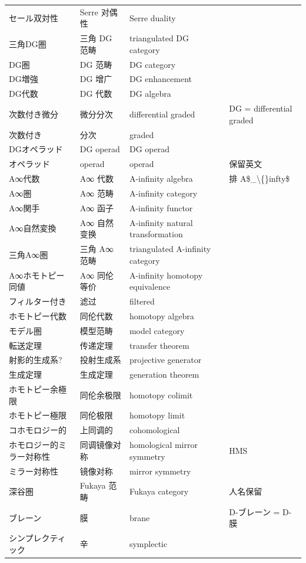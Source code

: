 \begin{longtable}{p{}p{}p{}p{}}
セール双対性 & Serre 对偶性 & Serre duality &  \\
三角DG圏 & 三角 DG 范畴 & triangulated DG category &  \\
DG圏 & DG 范畴 & DG category &  \\
DG増強 & DG 增广 & DG enhancement &  \\
DG代数 & DG 代数 & DG algebra &  \\
次数付き微分 & 微分分次 & differential graded & DG = differential graded \\
次数付き & 分次 & graded &  \\
DGオペラッド & DG operad & DG operad &  \\
オペラッド & operad & operad & 保留英文 \\
A∞代数 & A∞ 代数 & A-infinity algebra & 排 A\$\_\textbackslash\{\}infty\$ \\
A∞圏 & A∞ 范畴 & A-infinity category &  \\
A∞関手 & A∞ 函子 & A-infinity functor &  \\
A∞自然変換 & A∞ 自然变换 & A-infinity natural transformation &  \\
三角A∞圏 & 三角 A∞ 范畴 & triangulated A-infinity category &  \\
A∞ホモトピー同値 & A∞ 同伦等价 & A-infinity homotopy equivalence &  \\
フィルター付き & 滤过 & filtered &  \\
ホモトピー代数 & 同伦代数 & homotopy algebra &  \\
モデル圏 & 模型范畴 & model category &  \\
転送定理 & 传递定理 & transfer theorem &  \\
射影的生成系? & 投射生成系 & projective generator &  \\
生成定理 & 生成定理 & generation theorem &  \\
ホモトピー余極限 & 同伦余极限 & homotopy colimit &  \\
ホモトピー極限 & 同伦极限 & homotopy limit &  \\
コホモロジー的 & 上同调的 & cohomological &  \\
ホモロジー的ミラー対称性 & 同调镜像对称 & homological mirror symmetry & HMS \\
ミラー対称性 & 镜像对称 & mirror symmetry &  \\
深谷圏 & Fukaya 范畴 & Fukaya category & 人名保留 \\
ブレーン & 膜 & brane & D-ブレーン = D-膜 \\
シンプレクティック & 辛 & symplectic &  \\

\end{longtable}
